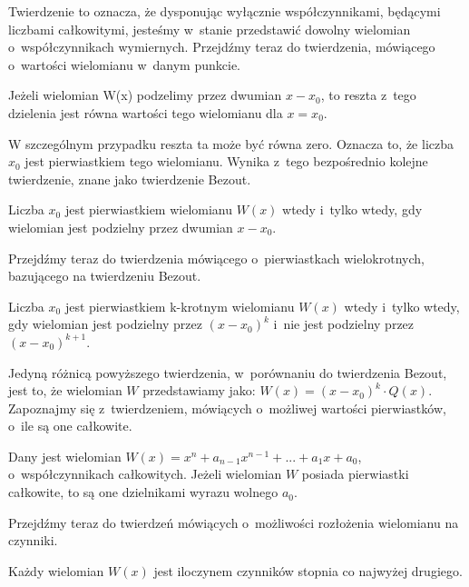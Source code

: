 Twierdzenie to oznacza, że dysponując wyłącznie współczynnikami, będącymi liczbami całkowitymi, jesteśmy w~stanie przedstawić dowolny wielomian o~współczynnikach wymiernych. Przejdźmy teraz do twierdzenia, mówiącego o~wartości wielomianu w~danym punkcie.

\begin{theorem}
	$ $\\
	Jeżeli wielomian W(x) podzelimy przez dwumian $x - x_0$, to reszta z~tego dzielenia jest równa wartości tego wielomianu dla $x = x_0$.
\end{theorem}

W szczególnym przypadku reszta ta może być równa zero. Oznacza to, że liczba $x_0$ jest pierwiastkiem tego wielomianu. Wynika z~tego bezpośrednio kolejne twierdzenie, znane jako twierdzenie Bezout.

\begin{theorem}[Bezout]
	$ $\\
	Liczba $x_0$ jest pierwiastkiem wielomianu $W(x)$ wtedy i~tylko wtedy, gdy wielomian jest podzielny przez dwumian $x - x_0$.
\end{theorem}

Przejdźmy teraz do twierdzenia mówiącego o~pierwiastkach wielokrotnych, bazującego na twierdzeniu Bezout.

\begin{theorem}
	$ $\\
	Liczba $x_0$ jest pierwiastkiem k-krotnym wielomianu $W(x)$ wtedy i~tylko wtedy, gdy wielomian jest podzielny przez $(x - x_0)^k$ i~nie jest podzielny przez $(x - x_0)^{k+1}$.
\end{theorem}

Jedyną różnicą powyższego twierdzenia, w~porównaniu do twierdzenia Bezout, jest to, że wielomian $W$ przedstawiamy jako: $W(x) = (x-x_0)^k \cdot Q(x)$. Zapoznajmy się z~twierdzeniem, mówiących o~możliwej wartości pierwiastków, o~ile są one całkowite.

\begin{theorem}
	$ $\\
	Dany jest wielomian $W(x) = x^n + a_{n-1}x^{n-1} + ... + a_1x + a_0$, o~współczynnikach całkowitych. Jeżeli wielomian $W$ posiada pierwiastki całkowite, to są one dzielnikami wyrazu wolnego $a_0$.
\end{theorem}

Przejdźmy teraz do twierdzeń mówiących o~możliwości rozłożenia wielomianu na czynniki.

\begin{theorem}
	$ $\\
	Każdy wielomian $W(x)$ jest iloczynem czynników stopnia co najwyżej drugiego.
\end{theorem}

